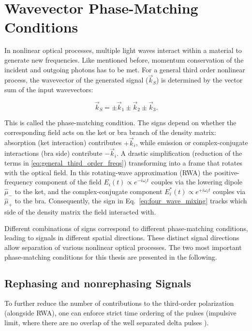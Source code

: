 \section{Wavevector Phase-Matching Conditions}
\label{sec:phase_matching}

\noindent 
In nonlinear optical processes, multiple light waves interact within a material to generate new frequencies. Like mentioned before, momentum conservation of the incident and outgoing photons has to be met. For a general third order nonlinear process, the wavevector of the generated signal ($\vec{k}_S$) is determined by the vector sum of the input wavevectors:

\begin{equation}
	\vec{k}_S = \pm\vec{k}_1 \pm\vec{k}_2 \pm\vec{k}_3.
	\label{eq:four_wave_mixing}
\end{equation}

\noindent
This is called the phase-matching condition.
The signs depend on whether the corresponding field acts on the ket or bra branch of the density matrix: absorption (ket interaction) contributes $+\vec{k}_i$, while emission or complex-conjugate interactions (bra side) contribute $-\vec{k}_i$. 
A drastic simplification (reduction of the terms in \eqref{eq:general_third_order_freqs}) transforming into a frame that rotates with the optical field. In this rotating-wave approximation (RWA) the positive-frequency component of the field $E_i(t) \propto e^{-i\omega_i t}$ couples via the lowering dipole $\hat{\mu}_{-}$ to the ket, and the complex-conjugate component $E_i^{*}(t) \propto e^{+i\omega_i t}$ couples via $\hat{\mu}_{+}$ to the bra. Consequently, the sign in Eq.~\eqref{eq:four_wave_mixing} tracks which side of the density matrix the field interacted with.

\noindent
Different combinations of signs correspond to different phase-matching conditions, leading to signals in different spatial directions. These distinct signal directions allow separation of various nonlinear optical processes. The two most important phase-matching conditions for this thesis are presented in the following.



\subsection{Rephasing and nonrephasing Signals}
\label{subsec:rephasing_nonrephasing}

\noindent
To further reduce the number of contributions to the third-order polarization (alongside RWA), one can enforce strict time ordering of the pulses (impulsive limit, where there are no overlap of the well separated delta pulses \cite{cho2009twodimensionalopticalspectroscopy, hamm2005principlesnonlinearoptical}).

